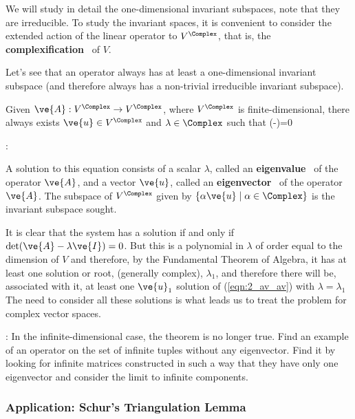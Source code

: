 We will study in detail the one-dimensional invariant subspaces, note that they are irreducible. 
To study the invariant spaces, it is convenient to consider the extended action of the linear operator to $V^{\Complex}$, that is, the 
\textbf{complexification}~ of $V$.

Let's see that an operator always has at least a one-dimensional invariant subspace (and therefore always has a non-trivial irreducible invariant subspace).

\begin{lem}
Given $\ve{A}: V^{\Complex} \to V^{\Complex}$, where $V^{\Complex}$ is finite-dimensional, there always exists $\ve{u} \in V^{\Complex}$
and $\lambda \in \Complex$ such that
\beq
(-\lambda {})=0   
\label{eqn:2_av_av}
\eeq
\end{lem}

\pru:

A solution to this equation consists of a scalar $\lambda$, called an {\bf eigenvalue}~ of
the operator $\ve{A}$, and a vector $\ve{u}$, called an {\bf eigenvector}~
of the operator $\ve{A}$. The subspace of $V^{\Complex}$ given by 
$\{\alpha \ve{u}\;|\; \alpha \in \Complex\}$ is the invariant subspace sought.

It is clear that the system has a solution if and only if $ \det(\ve{A}-\lambda\ve{I})=0$. But this is a polynomial in
$\lambda$ of order equal to the dimension of $V$ and therefore, by the Fundamental Theorem of Algebra, it has
at least one solution or root, (generally complex), $\lambda_1$, 
and therefore there will be, associated with it, 
at least one $\ve{u}_1$ solution of (\ref{eqn:2_av_av}) with $\lambda = \lambda_1$
\epru
\espa
The need to consider all these solutions is what leads us to treat the problem for complex vector spaces. 

\ejer: In the infinite-dimensional case, the theorem is no longer true. Find an example of an operator on the set of infinite tuples without any eigenvector. Find it by looking for infinite matrices constructed in such a way that they have only one eigenvector and consider the limit to infinite components.


\subsubsection{Application: Schur's Triangulation Lemma}
\label{subsub:Aplicacion:_Lema_de_triangulacion_de_Schur}

